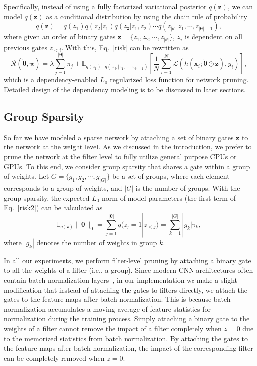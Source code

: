 \documentclass[runningheads, envcountsame, a4paper]{llncs}
\def\bs{\boldsymbol}
\begin{document}
Specifically, instead of using a fully factorized variational posterior $q(\bs{z})$, we can model $q(\bs{z})$ as a conditional distribution by using the chain rule of probability
\[
q(\bs{z}) = q(z_1) q(z_2|z_1) q(z_3|z_1,z_2) \cdots q(z_{|\theta|} | z_1,\cdots, z_{|\bs{\theta}|-1}),
\]
where given an order of binary gates $\bs{z}=\{z_1,z_2,\cdots,z_{|\theta|}\}$, $z_i$ is dependent on all previous gates $z_{<i}$. With this, Eq.~\ref{risk} can be rewritten as
  \begin{equation}\label{risk2}
    \mathcal{R}(\tilde{\bs{\theta}}, \bs{\pi}) = \lambda \sum_{j=1}^{|\bs{\theta}|} \pi_{j}+ \mathbb{E}_{q(z_1)\cdots q(z_{|\bs{\theta}|}|z_1,\cdots,z_{|\bs{\theta}|-1})}\left[\frac{1}{N}\sum_{i=1}^{N} \mathcal{L}\left(h(\bs{x}_{i} ; \tilde{\bs{\theta}} \odot \bs{z}), y_i\right)\right],
  \end{equation}
which is a dependency-enabled $L_0$ regularized loss function for network pruning. Detailed design of the dependency modeling is to be discussed in later sections.

\subsection{Group Sparsity}\label{sec:group}
So far we have modeled a sparse network by attaching a set of binary gates $\bs{z}$ to the network at the weight level. As we discussed in the introduction, we prefer to prune the network at the filter level to fully utilize general purpose CPUs or GPUs. To this end, we consider group sparsity that shares a gate within a group of weights. Let $G=\{g_1,g_2,\cdots,g_{|G|}\}$ be a set of groups, where each element corresponds to a group of weights, and $|G|$ is the number of groups. With the group sparsity, the expected $L_0$-norm of model parameters (the first term of Eq.~\ref{risk2}) can be calculated as 
\begin{equation}
  \mathbb{E}_{q(\bs{z})}\|\bs{\theta}\|_{0}=\sum_{j=1}^{|\bs{\theta}|} q(z_j=1|z_{<j})=\sum_{k=1}^{|G|} |g_k|\pi_{k},
\end{equation}
where $|g_k|$ denotes the number of weights in group $k$.

In all our experiments, we perform filter-level pruning by attaching a binary gate to all the weights of a filter (i.e., a group). Since modern CNN architectures often contain batch normalization layers~\cite{batchnorm}, in our implementation we make a slight modification that instead of attaching the gates to filters directly, we attach the gates to the feature maps after batch normalization. This is because batch normalization accumulates a moving average of feature statistics for normalization during the training process. Simply attaching a binary gate to the weights of a filter cannot remove the impact of a filter completely when $z=0$ due to the memorized statistics from batch normalization. By attaching the gates to the feature maps after batch normalization, the impact of the corresponding filter can be completely removed when $z=0$.
\end{document}
